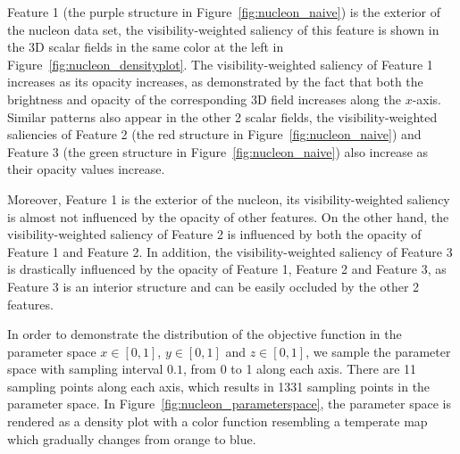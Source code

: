 Feature 1 (the purple structure in Figure~\ref{fig:nucleon_naive}) is the exterior of the nucleon data set, the visibility-weighted saliency of this feature is shown in the 3D scalar fields in the same color at the left in Figure~\ref{fig:nucleon_densityplot}.
The visibility-weighted saliency of Feature 1 increases as its opacity increases,
as demonstrated by the fact that both the brightness and opacity of the corresponding 3D field increases along the $x$-axis.
Similar patterns also appear in the other 2 scalar fields, the visibility-weighted saliencies of Feature 2 (the red structure in Figure~\ref{fig:nucleon_naive}) and Feature 3 (the green structure in Figure~\ref{fig:nucleon_naive}) also increase as their opacity values increase.



Moreover, Feature 1 is the exterior of the nucleon, its visibility-weighted saliency is almost not influenced by the opacity of other features. On the other hand, the visibility-weighted saliency of Feature 2 is influenced by both the opacity of Feature 1 and Feature 2. In addition, the visibility-weighted saliency of Feature 3 is drastically influenced by the opacity of Feature 1, Feature 2 and Feature 3, as Feature 3 is an interior structure and can be easily occluded by the other 2 features.

In order to demonstrate the distribution of the objective function in the parameter space $ x \in [0,1] $, $ y \in [0,1] $ and $ z \in [0,1] $, we sample the parameter space with sampling interval $ 0.1 $, from 0 to 1 along each axis. There are 11 sampling points along each axis, which results in 1331 sampling points in the parameter space. In Figure~\ref{fig:nucleon_parameterspace}, the parameter space is rendered as a density plot with a color function resembling a temperate map which gradually changes from orange to blue.

